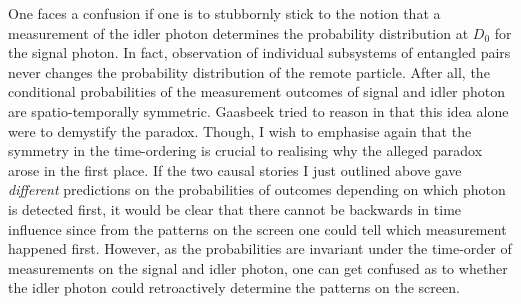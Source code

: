 \documentclass[11pt]{article}
\numberwithin{equation}{section}
\begin{document}
 

One faces a confusion if one is to stubbornly stick to the notion that a measurement of the idler photon determines the probability distribution at $D_0$ for the signal photon. In fact, observation of individual subsystems of entangled pairs never changes the probability distribution of the remote particle. After all, the conditional probabilities of the measurement outcomes of signal and idler photon are spatio-temporally symmetric. Gaasbeek tried to reason in \cite{Gaasbeek2010} that this idea alone were to demystify the paradox. Though, I wish to emphasise again that the symmetry in the time-ordering is crucial to realising why the alleged paradox arose in the first place. If the two causal stories I just outlined above gave \textit{different} predictions on the probabilities of outcomes depending on which photon is detected first, it would be clear that there cannot be backwards in time influence since from the patterns on the screen one could tell which measurement happened first. However, as the probabilities are invariant under the time-order of measurements on the signal and idler photon, one can get confused as to whether the idler photon could retroactively determine the patterns on the screen. 

\end{document}
